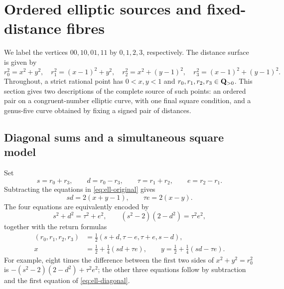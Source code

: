 \section{Ordered elliptic sources and fixed-distance fibres}
\label{sec:elliptic-sources}

We label the vertices $00,10,01,11$ by $0,1,2,3$, respectively.
The distance surface is given by
\begin{equation}\label{eq:ell-original}
 r_0^2=x^2+y^2,\quad r_1^2=(x-1)^2+y^2,\quad
 r_2^2=x^2+(y-1)^2,\quad r_3^2=(x-1)^2+(y-1)^2.
\end{equation}
Throughout, a strict rational point has $0<x,y<1$ and
$r_0,r_1,r_2,r_3\in\mathbf Q_{>0}$.  This section gives two descriptions of
the complete source of such points: an ordered pair on a congruent-number
elliptic curve, with one final square condition, and a genus-five curve
obtained by fixing a signed pair of distances.

\subsection{Diagonal sums and a simultaneous square model}

Set
\[
 s=r_0+r_3,\qquad d=r_0-r_3,\qquad
 \tau=r_1+r_2,\qquad e=r_2-r_1.
\]
Subtracting the equations in \eqref{eq:ell-original} gives
\[
 sd=2(x+y-1),\qquad \tau e=2(x-y).
\]
The four equations are equivalently encoded by
\begin{equation}\label{eq:ell-diagonal}
 s^2+d^2=\tau^2+e^2,\qquad
 (s^2-2)(2-d^2)=\tau^2e^2,
\end{equation}
together with the return formulas
\begin{equation}\label{eq:ell-diagonal-return}
 \begin{aligned}
 (r_0,r_1,r_2,r_3)&=\tfrac12(s+d,\tau-e,\tau+e,s-d),\\
 x&=\tfrac12+\tfrac14(sd+\tau e),\qquad
 y=\tfrac12+\tfrac14(sd-\tau e).
 \end{aligned}
\end{equation}
For example, eight times the difference between the first two sides of
$x^2+y^2=r_0^2$ is
$-(s^2-2)(2-d^2)+\tau^2e^2$; the other three equations follow by
subtraction and the first equation of \eqref{eq:ell-diagonal}.

